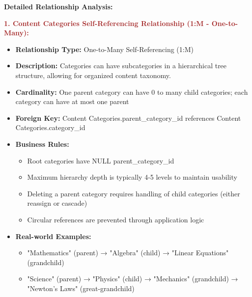 \documentclass[12pt,a4paper,oneside]{book}
\begin{document}
\textbf{Detailed Relationship Analysis:}

\textbf{\textcolor{brown}{1. Content Categories Self-Referencing Relationship (1:M - One-to-Many):}}
\begin{itemize}
    \item \textbf{Relationship Type:} One-to-Many Self-Referencing (1:M)
    \item \textbf{Description:} Categories can have subcategories in a hierarchical tree structure, allowing for organized content taxonomy.
    \item \textbf{Cardinality:} One parent category can have 0 to many child categories; each category can have at most one parent
    \item \textbf{Foreign Key:} Content Categories.parent\_category\_id references Content Categories.category\_id
    \item \textbf{Business Rules:}
        \begin{itemize}
            \item Root categories have NULL parent\_category\_id
            \item Maximum hierarchy depth is typically 4-5 levels to maintain usability
            \item Deleting a parent category requires handling of child categories (either reassign or cascade)
            \item Circular references are prevented through application logic
        \end{itemize}
    \item \textbf{Real-world Examples:}
        \begin{itemize}
            \item "Mathematics" (parent) → "Algebra" (child) → "Linear Equations" (grandchild)
            \item "Science" (parent) → "Physics" (child) → "Mechanics" (grandchild) → "Newton's Laws" (great-grandchild)
        \end{itemize}
\end{itemize}
\end{document}
